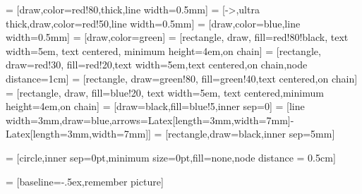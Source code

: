  = [draw,color=red!80,thick,line width=0.5mm]
 = [->,ultra thick,draw,color=red!50,line width=0.5mm]
 = [draw,color=blue,line width=0.5mm]
 = [draw,color=green]
 = [rectangle, draw, fill=red!80!black, text width=5em, text centered, minimum height=4em,on chain]
 = [rectangle, draw=red!30, fill=red!20,text width=5em,text centered,on chain,node distance=1cm]
 = [rectangle, draw=green!80, fill=green!40,text centered,on chain]
 = [rectangle, draw, fill=blue!20, text width=5em, text centered,minimum height=4em,on chain]
 = [draw=black,fill=blue!5,inner sep=0]
 = [line width=3mm,draw=blue,arrows={Latex[length=3mm,width=7mm]-Latex[length=3mm,width=7mm]}]
 = [rectangle,draw=black,inner sep=5mm]



 = [circle,inner sep=0pt,minimum size=0pt,fill=none,node distance = 0.5cm]

 = [baseline=-.5ex,remember picture]

\newcommand{\matlab}{MATLAB\xspace}

\newcommand{\cubesat}[2]{
    \draw (#1:#2) node{\pgftext[rotate=#1]{\texttt{[image: cube-icon]}}};
    \draw[->,cyan,thick] (#1:#2) -- +(#1+90:\axlen);
    \draw (#1:#2) ++(#1+90:\axlen) node[rotate=#1-90,anchor=south west] {\tiny +Y};
    \draw[->,red,thick] (#1:#2) -- +(#1:\axlen);
    \draw (#1:#2) ++(#1:\axlen) node[rotate=#1-90,anchor=north west] {\tiny -Z};
}


